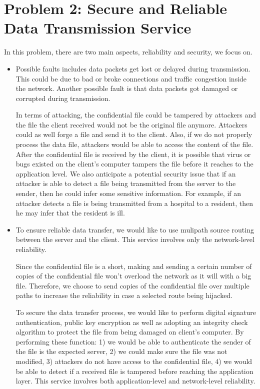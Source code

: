 \section{Problem 2: Secure and Reliable Data Transmission Service}

In this problem, there are two main aspects, reliability and security, we focus on.

\begin{itemize}

\item Possible faults includes data packets get lost or delayed during transmission. This could be due to bad or broke connections and traffic congestion inside the network. Another possible fault is that data packets got damaged or corrupted during transmission.

In terms of attacking, the confidential file could be tampered by attackers and the file the client received would not be the original file anymore. Attackers could as well forge a file and send it to the client. Also, if we do not properly process the data file, attackers would be able to access the content of the file. After the confidential file is received by the client, it is possible that virus or bugs existed on the client's computer tampers the file before it reaches to the application level. We also anticipate a potential security issue that if an attacker is able to detect a file being transmitted from the server to the sender, then he could infer some sensitive information. For example, if an attacker detects a file is being transmitted from a hospital to a resident, then he may infer that the resident is ill.

\item To ensure reliable data transfer, we would like to use mulipath source routing between the server and the client. This service involves only the  network-level reliability.

Since the confidential file is a short, making and sending a certain number of copies of the confidential file won't overload the network as it will with a big file. Therefore, we choose to send copies of the confidential file over multiple paths to increase the reliability in case a selected route being hijacked.

To secure the data transfer process, we would like to perform digital signature authentication, public key encryption as well as adopting an integrity check algorithm to protect the file from being damaged on client's computer. By performing these function: 1) we would be able to authenticate the sender of the file is the expected server, 2) we could make sure the file was not modified, 3) attackers do not have access to the confidential file, 4) we would be able to detect if a received file is tampered before reaching the application layer. This service involves both application-level and network-level reliability.


\end{itemize}
